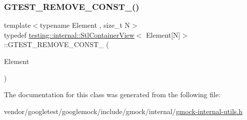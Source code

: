 \mbox{\label{classtesting_1_1internal_1_1_stl_container_view_3_01_element[_n]_4_af8c1aa62de6f8a5d3126c7b3badfefdb}} 
\subsubsection{\texorpdfstring{G\+T\+E\+S\+T\+\_\+\+R\+E\+M\+O\+V\+E\+\_\+\+C\+O\+N\+S\+T\+\_\+()}{GTEST\_REMOVE\_CONST\_()}}
{\footnotesize\ttfamily template$<$typename Element , size\+\_\+t N$>$ \\
typedef \hyperlink{classtesting_1_1internal_1_1_stl_container_view}{testing\+::internal\+::\+Stl\+Container\+View}$<$ Element\mbox{[}N\mbox{]}$>$\+::G\+T\+E\+S\+T\+\_\+\+R\+E\+M\+O\+V\+E\+\_\+\+C\+O\+N\+S\+T\+\_\+ (\begin{DoxyParamCaption}\item[{Element}]{ }\end{DoxyParamCaption})}



The documentation for this class was generated from the following file\+:\begin{DoxyCompactItemize}
\item 
vendor/googletest/googlemock/include/gmock/internal/\hyperlink{gmock-internal-utils_8h}{gmock-\/internal-\/utils.\+h}\end{DoxyCompactItemize}
